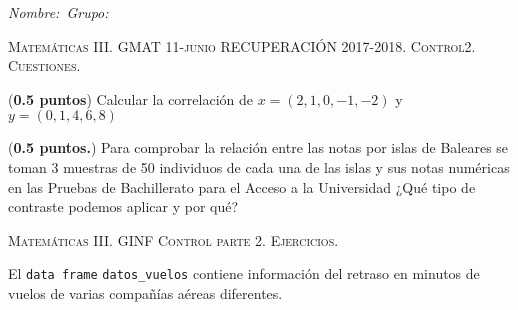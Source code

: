\documentclass[10pt]{article}
\newcounter{problemes}
\newcounter{punts} \def\thepunts{\arabic{punts}}
\def\probl{\addtocounter{problemes}{1} \setcounter{punts}{0}
\medskip\noindent{\bf \theproblemes) }}
\begin{document}


\noindent\emph{Nombre:}\hfill\hfill\hfill\hfill\hfill\hfill\hfill\ \emph{Grupo:}\hfill \vspace*{-2ex}




\begin{center}
\textsc{Matemáticas III. GMAT 11-junio RECUPERACIÓN 2017-2018.  Control2. Cuestiones.}\\[1ex]%
\end{center}



\probl (\textbf{0.5 puntos})
Calcular la correlación de $x=(2,1,0,-1,-2)$ y $y=(0,1,4,6,8)$
\vspace{4cm}


\probl  (\textbf{0.5 puntos.})   Para comprobar la relación entre  las notas por islas de Baleares se toman 3 muestras de 50 individuos de cada una de las islas y sus notas numéricas  en las Pruebas de Bachillerato para el Acceso a la Universidad ¿Qué tipo de contraste podemos aplicar y por qué?





\newpage
 
\begin{center}
\textsc{Matemáticas III. GINF Control parte 2. Ejercicios.}
\end{center}



\setcounter{problemes}{0}
\probl El \verb+data frame+ \verb+datos_vuelos+ contiene información del retraso en minutos de vuelos de varias compañías aéreas diferentes.
\end{document}
